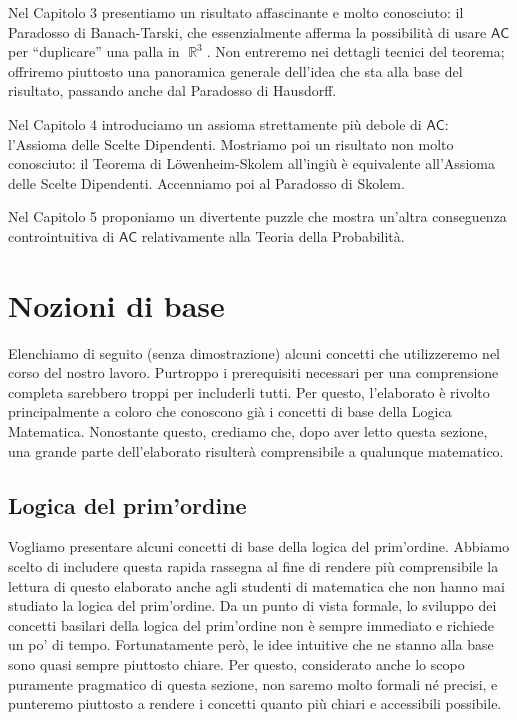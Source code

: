 \documentclass[12pt,a4paper]{report}
\theoremstyle{definition}
\theoremstyle{num.custom-title}
\DeclareMathOperator{\R}{\mathbb{R}}
\newcommand{\AC}{\ensuremath{\mathsf{AC}}\xspace}
\begin{document}
Nel Capitolo 3 presentiamo un risultato affascinante e molto conosciuto: il Paradosso di Banach-Tarski, che essenzialmente afferma la possibilità di usare \AC per ``duplicare'' una palla in $\R^3$. Non entreremo nei dettagli tecnici del teorema; offriremo piuttosto una panoramica generale dell'idea che sta alla base del risultato, passando anche dal Paradosso di Hausdorff.

Nel Capitolo 4 introduciamo un assioma strettamente più debole di \AC: l'Assioma delle Scelte Dipendenti. Mostriamo poi un risultato non molto conosciuto: il Teorema di Löwenheim-Skolem all'ingiù è equivalente all'Assioma delle Scelte Dipendenti. Accenniamo poi al Paradosso di Skolem.

Nel Capitolo 5 proponiamo un divertente puzzle che mostra un'altra conseguenza controintuitiva di \AC relativamente alla Teoria della Probabilità.






\chapter*{Nozioni di base}


\setcounter{page}{1}


Elenchiamo di seguito (senza dimostrazione) alcuni concetti che utilizzeremo nel corso del nostro lavoro. Purtroppo i prerequisiti necessari per una comprensione completa sarebbero troppi per includerli tutti. Per questo, l'elaborato è rivolto principalmente a coloro che conoscono già i concetti di base della Logica Matematica. Nonostante questo, crediamo che, dopo aver letto questa sezione, una grande parte dell'elaborato risulterà comprensibile a qualunque matematico.

\section{Logica del prim'ordine}

Vogliamo presentare alcuni concetti di base della logica del prim'ordine. Abbiamo scelto di includere questa rapida rassegna al fine di rendere più comprensibile la lettura di questo elaborato anche agli studenti di matematica che non hanno mai studiato la logica del prim'ordine. Da un punto di vista formale, lo sviluppo dei concetti basilari della logica del prim'ordine non è sempre immediato e richiede un po' di tempo. Fortunatamente però, le idee intuitive che ne stanno alla base sono quasi sempre piuttosto chiare. Per questo, considerato anche lo scopo puramente pragmatico di questa sezione, non saremo molto formali né precisi, e punteremo piuttosto a rendere i concetti quanto più chiari e accessibili possibile.
\end{document}
